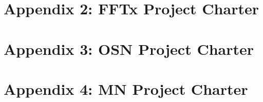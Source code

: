 \documentclass[draftclsnofoot,12pt,journal,onecolumn]{IEEEtran}
\begin{document}
\section{Appendix 2: FFTx Project Charter}


\section{Appendix 3: OSN Project Charter}


\section{Appendix 4: MN Project Charter}


\end{document}
